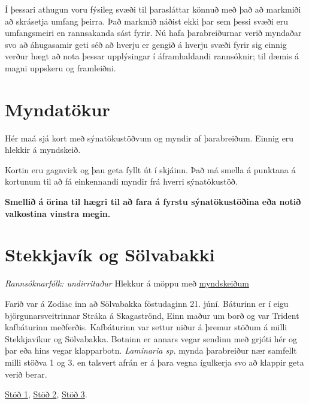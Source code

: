 \documentclass[icelandic,]{book}
\begin{document}
Í þessari athugun voru fýsileg svæði til þarasláttar könnuð með það að markmiði að skrásetja umfang þeirra. Það markmið náðist ekki þar sem þessi svæði eru umfangsmeiri en rannsakanda sást fyrir. Nú hafa þarabreiðurnar verið myndaðar svo að áhugasamir geti séð að hverju er gengið á hverju svæði fyrir sig einnig verður hægt að nota þessar upplýsingar í áframhaldandi rannsóknir; til dæmis á magni uppskeru og framleiðni.

\hypertarget{results}{%
\chapter{Myndatökur}\label{results}}

Hér maá sjá kort með sýnatökustöðvum og myndir af þarabreiðum. Einnig eru hlekkir á myndskeið.

Kortin eru gagnvirk og þau geta fyllt út í skjáinn. Það má smella á punktana á kortunum til að fá einkennandi myndir frá hverri sýnatökustöð.

\textbf{Smellið á örina til hægri til að fara á fyrstu sýnatökustöðina eða notið valkostina vinstra megin.}

\hypertarget{stekkjavik-og-solvabakki}{%
\chapter*{Stekkjavík og Sölvabakki}\label{stekkjavik-og-solvabakki}}

\emph{Rannsóknarfólk: undirritaður} Hlekkur á möppu með \href{https://www.dropbox.com/sh/pcobg1zexnhsm9r/AABOmyp9I87GbuT6qs3SRxWDa?dl=0}{myndskeiðum}

Farið var á Zodiac inn að Sölvabakka föstudaginn 21. júní. Báturinn er í eigu björgunarsveitrinnar Stráka á Skagaströnd, Einn maður um borð og var Trident kafbáturinn meðferðis. Kafbáturinn var settur niður á þremur stöðum á milli Stekkjavíkur og Sölvabakka. Botninn er annars vegar sendinn með grjóti hér og þar eða hins vegar klapparbotn. \emph{Laminaria sp.} mynda þarabreiður nær samfellt milli stöðva 1 og 3. en talsvert afrán er á þara vegna ígulkerja svo að klappir geta verið berar.

\href{https://www.dropbox.com/s/6eh4ntihn256yt7/Trident-Jun-21-115230-HQ.mp4?dl=0}{Stöð 1},
\href{https://www.dropbox.com/s/y25irxzi70btw6s/Trident-Jun-21-122032-HQ.mp4?dl=0}{Stöð 2},
\href{https://www.dropbox.com/s/u30ejcqt9aw63d2/Trident-Jun-21-133207-HQ.mp4?dl=0}{Stöð 3}.
\end{document}
